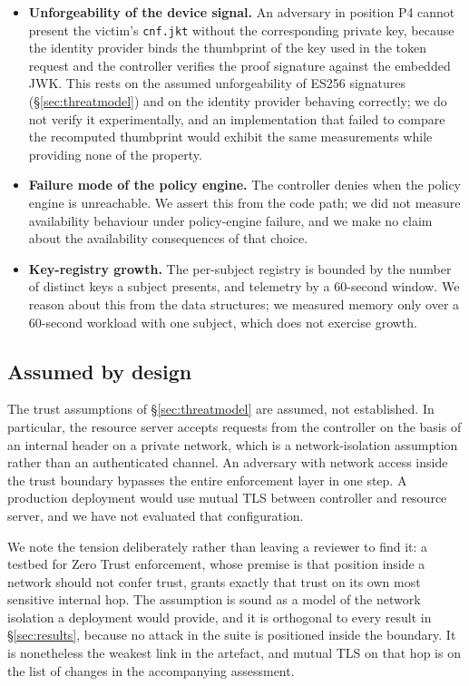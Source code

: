 \begin{itemize}
  \item \textbf{Unforgeability of the device signal.} An adversary in position P4 cannot present the victim's \texttt{cnf.jkt} without the corresponding private key, because the identity provider binds the thumbprint of the key used in the token request and the controller verifies the proof signature against the embedded JWK. This rests on the assumed unforgeability of ES256 signatures (\S\ref{sec:threatmodel}) and on the identity provider behaving correctly; we do not verify it experimentally, and an implementation that failed to compare the recomputed thumbprint would exhibit the same measurements while providing none of the property.
  \item \textbf{Failure mode of the policy engine.} The controller denies when the policy engine is unreachable. We assert this from the code path; we did not measure availability behaviour under policy-engine failure, and we make no claim about the availability consequences of that choice.
  \item \textbf{Key-registry growth.} The per-subject registry is bounded by the number of distinct keys a subject presents, and telemetry by a 60-second window. We reason about this from the data structures; we measured memory only over a 60-second workload with one subject, which does not exercise growth.
\end{itemize}

\subsection{Assumed by design}

The trust assumptions of \S\ref{sec:threatmodel} are assumed, not established. In particular, the resource server accepts requests from the controller on the basis of an internal header on a private network, which is a network-isolation assumption rather than an authenticated channel. An adversary with network access inside the trust boundary bypasses the entire enforcement layer in one step. A production deployment would use mutual TLS between controller and resource server, and we have not evaluated that configuration.

We note the tension deliberately rather than leaving a reviewer to find it: a testbed for Zero Trust enforcement, whose premise is that position inside a network should not confer trust, grants exactly that trust on its own most sensitive internal hop. The assumption is sound as a model of the network isolation a deployment would provide, and it is orthogonal to every result in \S\ref{sec:results}, because no attack in the suite is positioned inside the boundary. It is nonetheless the weakest link in the artefact, and mutual TLS on that hop is on the list of changes in the accompanying assessment.

